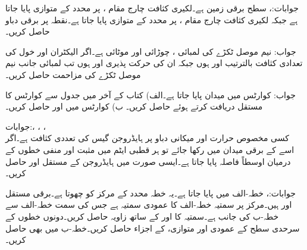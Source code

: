 جوابات:، 
سطح  برقی زمین ہے۔لکیری کثافت چارج  مقام ،  پر  محدد کے متوازی پایا جاتا ہے جبکہ لکیری کثافت چارج  مقام ،  پر  محدد کے متوازی پایا جاتا ہے۔نقطہ  پر برقی دباو حاصل کریں۔

جواب:
نیم موصل ٹکڑے کی لمبائی ، چوڑائی  اور موٹائی  ہے۔اگر الیکٹران اور خول کی تعدادی کثافت بالترتیب  اور  ہوں جبکہ ان کی حرکت پذیری  اور  ہوں تب لمبائی جانب نیم موصل ٹکڑے کی مزاحمت حاصل کریں۔

جواب:
کوارٹس میں  میدان پایا جاتا ہے۔الف) کتاب کے آخر میں جدول  سے کوارٹس کا مستقل  دریافت کرتے ہوئے   حاصل کریں۔ ب) کوارٹس میں  اور  حاصل کریں۔

جوابات:، ، ، \\ 
کسی مخصوص حرارت اور میکانی دباو پر ہایڈروجن  گیس کی تعددی کثافت  ہے۔اگر اسے  کے برقی میدان میں رکھا جائے تو ہر قطبی ایٹم  میں مثبت اور منفی خطوں کے درمیان اوسطاً  فاصلہ پایا جاتا ہے۔ایسی صورت میں ہایڈروجن کے مستقل  اور  حاصل کریں۔

جوابات:، 
خطہ-الف میں  پایا جاتا ہے۔یہ خطہ محدد کے مرکز کو چھوتا ہے۔برقی مستقل  اور  ہیں۔مرکز پر  سمتیہ  خطہ-الف کا عمودی سمتیہ ہے جس کی سمت خطہ-الف سے خطہ-ب کی جانب ہے۔سمتیہ  کا اور    کے ساتھ زاویہ حاصل کریں۔دونوں خطوں کے سرحدی سطح کے عمودی اور متوازی،  کے  اجزاء حاصل کریں۔خطہ-ب میں  بھی حاصل کریں۔

